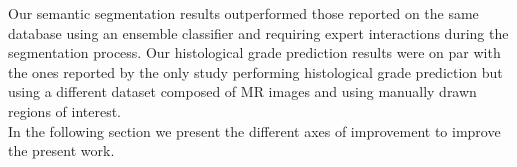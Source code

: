 Our semantic segmentation results outperformed those reported on the same database using an ensemble classifier and requiring expert interactions during the segmentation process.
Our histological grade prediction results were on par with the ones reported by the only study performing histological grade prediction but using a different dataset composed of MR images and using manually drawn regions of interest.\\
In the following section we present the different axes of improvement to improve the present work.


